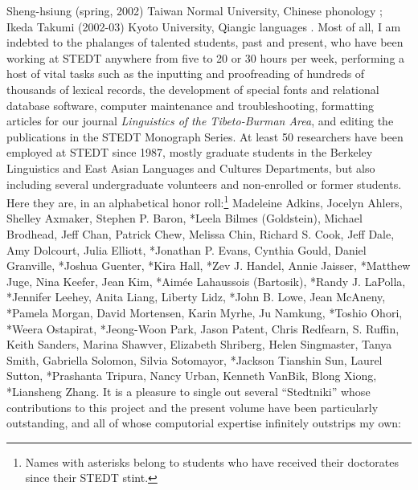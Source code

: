 \documentclass[12pt]{article}
\begin{document}
Sheng-hsiung (spring, 2002) Taiwan Normal University, Chinese phonology ; {\sc Ikeda} Takumi (2002-03) Kyoto University, Qiangic languages . Most of all, I am indebted to the phalanges of talented students, past and present, who have been working at STEDT anywhere from five to 20 or 30 hours per week, performing a host of vital tasks such as the inputting and proofreading of hundreds of thousands of lexical records, the development of special fonts and relational database software, computer maintenance and troubleshooting, formatting articles for our journal {\it Linguistics of the Tibeto-Burman Area}, and editing the publications in the STEDT Monograph Series. At least 50 researchers have been employed at STEDT since 1987, mostly graduate students in the Berkeley Linguistics and East Asian Languages and Cultures Departments, but also including several undergraduate volunteers and non-enrolled or former students. Here they are, in an alphabetical honor roll:\footnote{Names with asterisks belong to students who have received their doctorates since their STEDT stint.} Madeleine Adkins, Jocelyn Ahlers, Shelley Axmaker, Stephen P. Baron, *Leela Bilmes (Goldstein), Michael Brodhead, Jeff Chan, Patrick Chew, Melissa Chin, Richard S. Cook, Jeff Dale, Amy Dolcourt, Julia Elliott, *Jonathan P. Evans, Cynthia Gould, Daniel Granville, *Joshua Guenter, *Kira Hall, *Zev J. Handel, Annie Jaisser, *Matthew Juge, Nina Keefer, Jean Kim, *Aim\'ee Lahaussois (Bartosik), *Randy J. LaPolla, *Jennifer Leehey, Anita Liang, Liberty Lidz, *John B. Lowe, Jean McAneny, *Pamela Morgan, David Mortensen, Karin Myrhe, Ju Namkung, *Toshio Ohori, *Weera Ostapirat, *Jeong-Woon Park, Jason Patent, Chris Redfearn, S. Ruffin, Keith Sanders, Marina Shawver, Elizabeth Shriberg, Helen Singmaster, Tanya Smith, Gabriella Solomon, Silvia Sotomayor, *Jackson Tianshin Sun, Laurel Sutton, *Prashanta Tripura, Nancy Urban, Kenneth VanBik, Blong Xiong, *Liansheng Zhang. It is a pleasure to single out several ``Stedtniki''  whose contributions to this project and the present volume have been particularly outstanding, and all of whose computorial expertise infinitely outstrips my own:
\end{document}
